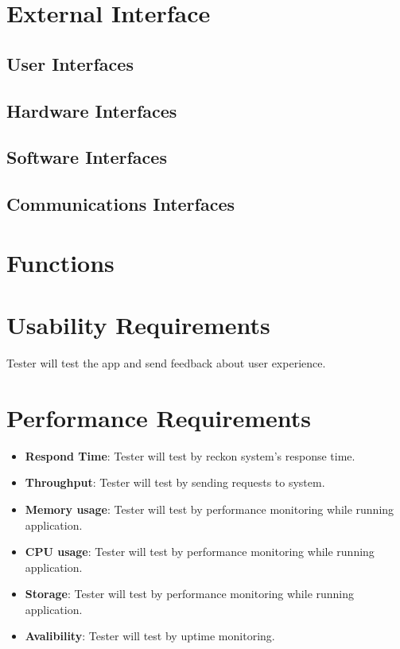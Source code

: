 \documentclass[ 10pt]{report}
\begin{document}
        \section{External Interface}
            \subsection{User Interfaces}
            \subsection{Hardware Interfaces}
            \subsection{Software Interfaces}
            \subsection{Communications Interfaces}
        \section{Functions}
        \section{Usability Requirements}
        Tester will test the app and send feedback about user experience.
        \section{Performance Requirements}
        \begin{itemize}
            \item \textbf{Respond Time}: Tester will test by reckon system's response time.  
            \item \textbf{Throughput}: Tester will test by sending requests to system.
            \item \textbf{Memory usage}: Tester will test by performance monitoring while running application.
            \item \textbf{CPU usage}: Tester will test by performance monitoring while running application.
            \item \textbf{Storage}: Tester will test by performance monitoring while running application.
            \item \textbf{Avalibility}: Tester will test by uptime monitoring.
            \end{itemize}
\end{document}
